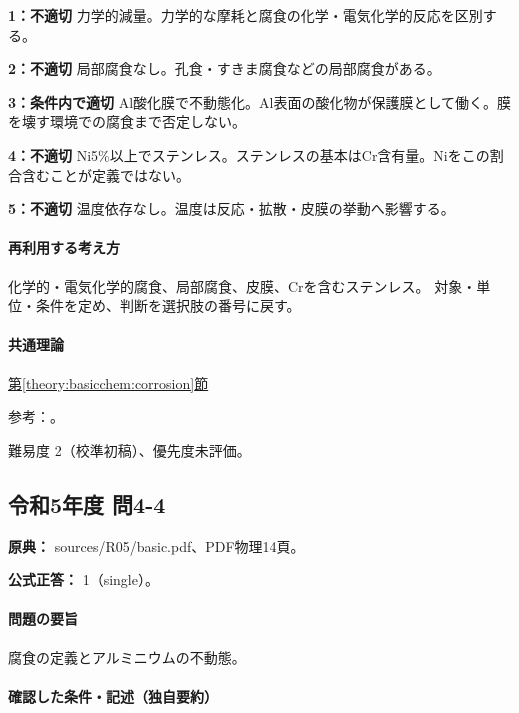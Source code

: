 \noindent\textbf{1：不適切} 力学的減量。力学的な摩耗と腐食の化学・電気化学的反応を区別する。\par

\noindent\textbf{2：不適切} 局部腐食なし。孔食・すきま腐食などの局部腐食がある。\par

\noindent\textbf{3：条件内で適切} Al酸化膜で不動態化。Al表面の酸化物が保護膜として働く。膜を壊す環境での腐食まで否定しない。\par

\noindent\textbf{4：不適切} Ni5\%以上でステンレス。ステンレスの基本はCr含有量。Niをこの割合含むことが定義ではない。\par

\noindent\textbf{5：不適切} 温度依存なし。温度は反応・拡散・皮膜の挙動へ影響する。\par

\paragraph{再利用する考え方} 化学的・電気化学的腐食、局部腐食、皮膜、Crを含むステンレス。 対象・単位・条件を定め、判断を選択肢の番号に戻す。

\paragraph{共通理論} \hyperref[theory:basicchem:corrosion]{第\ref*{theory:basicchem:corrosion}節}

\par 参考：\cite{stainless_definition2022,chem55_corrosion}。

\par 難易度 2（校準初稿）、優先度未評価。

\subsection{令和5年度 問4-4}
\label{q:r05-reg-basic-4-4}

\noindent\textbf{原典：} sources/R05/basic.pdf、PDF物理14頁。

\textbf{公式正答：} 1（single）。

\paragraph{問題の要旨} 腐食の定義とアルミニウムの不動態。

\paragraph{確認した条件・記述（独自要約）}\mbox{}\par

